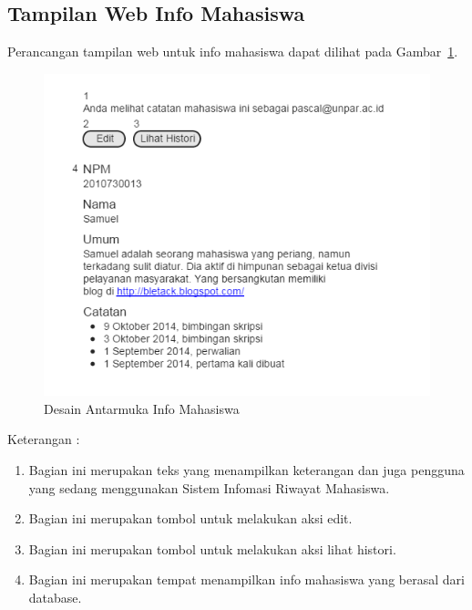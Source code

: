 \subsection{Tampilan Web Info Mahasiswa}
Perancangan tampilan web untuk info mahasiswa dapat dilihat pada Gambar~\ref{fig:infomahasiswa}.
\begin{figure}[H]
\centering
\includegraphics[scale=0.5]{Gambar/infomahasiswa.png}
\caption[Desain Antarmuka Info Mahasiswa]{Desain Antarmuka Info Mahasiswa}
\label{fig:infomahasiswa}
\end{figure}

Keterangan :
\begin{enumerate}[(1)]
\item
Bagian ini merupakan teks yang menampilkan keterangan dan juga pengguna yang sedang menggunakan Sistem Infomasi Riwayat Mahasiswa.
\item
Bagian ini merupakan tombol untuk melakukan aksi edit.
\item
Bagian ini merupakan tombol untuk melakukan aksi lihat histori.
\item
Bagian ini merupakan tempat menampilkan info mahasiswa yang berasal dari database.
\end{enumerate}


